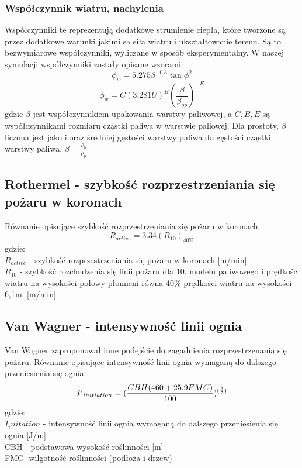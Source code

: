 \documentclass[a4paper, 11pt]{article}
\begin{document}
	\subsubsection{Współczynnik wiatru, nachylenia}
	
	Współczynniki te reprezentują dodatkowe strumienie ciepła, które tworzone są przez dodatkowe warunki jakimi są siła wiatru i ukształtowanie terenu. Są to bezwymiarowe współczynniki, wyliczane w sposób eksperymentalny. W naszej symulacji współczynniki zostały opisane wzorami: $$\phi_w = 5.275\beta^{-0.3}\tan\phi^{2}$$ 
	$$\phi_w = C(3.281U)^B\left(\frac{\beta}{\beta_{op}}\right)^{-E}$$ gdzie $\beta$ jest współczynnikiem upakowania warstwy paliwowej, a $C,B,E$ są współczynnikami rozmiaru cząstki paliwa w warstwie paliowej. Dla prostoty, $\beta$ liczona jest jako iloraz średniej gęstości warstwy paliwa do gęstości cząstki warstwy paliwa. $\beta=\frac{\rho_{b}}{\rho_{p}}$ 
	
	\subsection{Rothermel - szybkość rozprzestrzeniania się pożaru w koronach}
	\indent
	
	Równanie opisujące szybkość rozprzestrzeniania się pożaru w koronach:
	$$
	R_{active}=3.34(R_10)_{40\%}
	$$
	gdzie: \\
	$R_{active}$ - szybkość rozprzestrzeniania się pożaru w koronach [m/min]\\
	$R_10$ - szybkość rozchodzenia się linii pożaru dla 10. modelu paliwowego i prędkość wiatru na wysokości połowy płomieni równa 40\% prędkości wiatru na wysokości 6,1m. [m/min]\\
	
	\subsection{Van Wagner - intensywność linii ognia}
	\indent
	Van Wagner zaproponował inne podejście do zagadnienia rozprzestrzenania się pożaru. Równanie opisujące intensywność linii ognia wymaganą do dalszego przeniesienia się ognia:
	$$
	I`_{initiation}=(\frac{CBH(460+25.9FMC)}{100})^{(\frac{3}{2})}
	$$
	gdzie:\\
	$I_initation$ - intensywność linii ognia wymaganą do dalszego przeniesienia się ognia [J/m] \\
	CBH - podstawowa wysokość roślinności [m]\\
	FMC- wilgotność roślinności (podłoża i drzew)\\
	\iffalse
\end{document}

